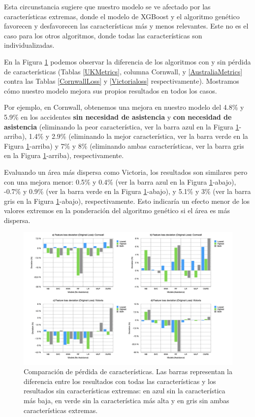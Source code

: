 \documentclass{uathesis-es}
\begin{document}
{Esta circunstancia sugiere que nuestro modelo se ve afectado por las características extremas, donde el modelo de XGBoost y el algoritmo genético favorecen y desfavorecen las características más y menos relevantes. Este no es el caso para los otros algoritmos, donde todas las características son individualizadas.

En la Figura \ref{lossFig} podemos observar la diferencia de los algoritmos con y sin pérdida de características (Tablas \ref{UKMetrics}, columna Cornwall, y \ref{AustraliaMetrics} contra las Tablas \ref{CornwallLoss} y \ref{Victorialoss} respectivamente). Mostramos cómo nuestro modelo mejora sus propios resultados en todos los casos.

Por ejemplo, en Cornwall, obtenemos una mejora en nuestro modelo del 4.8\% y 5.9\% en los accidentes \textbf{sin necesidad de asistencia} y \textbf{con necesidad de asistencia} (eliminando la peor característica, ver la barra azul en la Figura \ref{lossFig}-arriba), 1.4\% y 2.9\% (eliminando la mejor característica, ver la barra verde en la Figura \ref{lossFig}-arriba) y 7\% y 8\% (eliminando ambas características, ver la barra gris en la Figura \ref{lossFig}-arriba), respectivamente.

Evaluando un área más dispersa como Victoria, los resultados son similares pero con una mejora menor: 0.5\% y 0.4\% (ver la barra azul en la Figura \ref{lossFig}-abajo), -0.7\% y 0.9\% (ver la barra verde en la Figura \ref{lossFig}-abajo), y 5.1\% y 3\% (ver la barra gris en la Figura \ref{lossFig}-abajo), respectivamente. Esto indicaría un efecto menor de los valores extremos en la ponderación del algoritmo genético si el área es más dispersa.

\begin{figure}[H]
	\centering
	\includegraphics[width=180mm]{Figures/LossFeatures/loss.png}
	\caption{Comparación de pérdida de características. Las barras representan la diferencia entre los resultados con todas las características y los resultados sin características extremas: en azul sin la característica más baja, en verde sin la característica más alta y en gris sin ambas características extremas.}
	\label{lossFig}
\end{figure}


}
\end{document}
